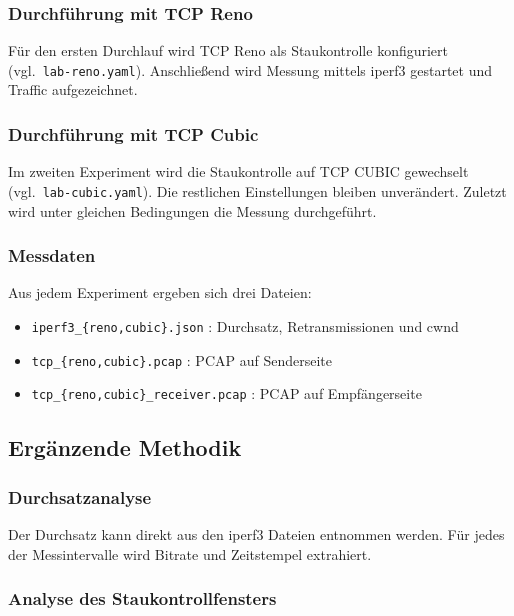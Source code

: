 \subsubsection{Durchführung mit TCP Reno}

Für den ersten Durchlauf wird TCP Reno als Staukontrolle konfiguriert (vgl.\ \texttt{lab-reno.yaml}).
Anschließend wird Messung mittels iperf3 gestartet und Traffic aufgezeichnet.

\subsubsection{Durchführung mit TCP Cubic}

Im zweiten Experiment wird die Staukontrolle auf TCP CUBIC gewechselt (vgl.\ \texttt{lab-cubic.yaml}).
Die restlichen Einstellungen bleiben unverändert.
Zuletzt wird unter gleichen Bedingungen die Messung durchgeführt.

\subsubsection{Messdaten}

Aus jedem Experiment ergeben sich drei Dateien:
\begin{itemize}
    \item \texttt{iperf3\_\{reno,cubic\}.json} : Durchsatz, Retransmissionen und cwnd
    \item \texttt{tcp\_\{reno,cubic\}.pcap} : PCAP auf Senderseite
    \item \texttt{tcp\_\{reno,cubic\}\_receiver.pcap} : PCAP auf Empfängerseite
\end{itemize}

\FloatBarrier{}
\subsection{Ergänzende Methodik}\label{sec:reno-cubic-methodik}

\subsubsection{Durchsatzanalyse}

Der Durchsatz kann direkt aus den iperf3 Dateien entnommen werden.
Für jedes der Messintervalle wird Bitrate und Zeitstempel extrahiert.

\subsubsection{Analyse des Staukontrollfensters}

